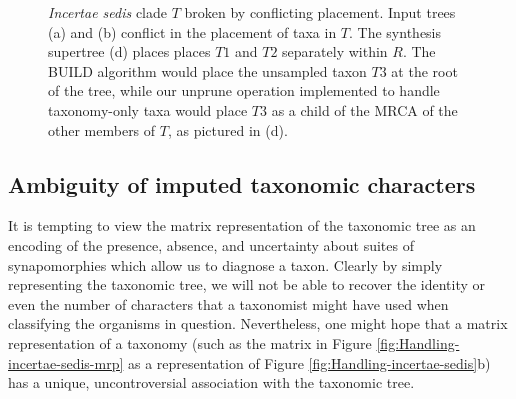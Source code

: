 \documentclass[english]{article}
\begin{document}
\begin{figure}
{}\hfill{}\hfill{}

\caption{\label{fig:Broken-incertae-sedis} \emph{Incertae sedis} clade $T$
broken by conflicting placement.
Input trees (a) and (b) conflict
in the placement of taxa in $T$.
The synthesis supertree (d) places
places $T1$ and $T2$ separately within $R$.
The BUILD algorithm would place the unsampled taxon $T3$ at the
root of the tree, while our unprune operation implemented to 
handle taxonomy-only taxa would place $T3$ as a child of the MRCA
of the other members of $T$, as pictured in (d).
}

\end{figure}

\subsection{Ambiguity of imputed taxonomic characters}
It is tempting to view the matrix representation of the taxonomic tree
    as an encoding of the presence, absence, and uncertainty about
    suites of synapomorphies which allow us to diagnose a taxon.
Clearly by simply representing the taxonomic tree, we will not be
    able to recover the identity or even the number of characters that
    a taxonomist might have used when classifying the organisms in question.
Nevertheless, one might hope that a matrix representation of a taxonomy (such
    as the matrix in Figure \ref{fig:Handling-incertae-sedis-mrp} as a 
    representation of Figure \ref{fig:Handling-incertae-sedis}b) has a unique, uncontroversial 
    association with the taxonomic tree.
\end{document}
